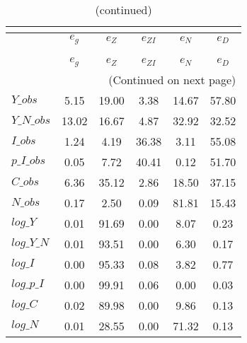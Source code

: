  
\begin{center}
\begin{longtable}{lccccc} 
\caption{VARIANCE DECOMPOSITION (in percent)}\\
 \label{Table:th_var_decomp_uncond}\\
\toprule 
$           $	 & 	 $       {e_g}$	 & 	 $       {e_Z}$	 & 	 $    {e_{ZI}}$	 & 	 $       {e_N}$	 & 	 $       {e_D}$\\
\midrule \endfirsthead 
\caption{(continued)}\\
 \toprule \\ 
$           $	 & 	 $       {e_g}$	 & 	 $       {e_Z}$	 & 	 $    {e_{ZI}}$	 & 	 $       {e_N}$	 & 	 $       {e_D}$\\
\midrule \endhead 
\midrule \multicolumn{6}{r}{(Continued on next page)} \\ \bottomrule \endfoot 
\bottomrule \endlastfoot 
$Y\_obs     $	 & 	        5.15	 & 	       19.00	 & 	        3.38	 & 	       14.67	 & 	       57.80 \\ 
$Y\_N\_obs  $	 & 	       13.02	 & 	       16.67	 & 	        4.87	 & 	       32.92	 & 	       32.52 \\ 
$I\_obs     $	 & 	        1.24	 & 	        4.19	 & 	       36.38	 & 	        3.11	 & 	       55.08 \\ 
$p\_I\_obs  $	 & 	        0.05	 & 	        7.72	 & 	       40.41	 & 	        0.12	 & 	       51.70 \\ 
$C\_obs     $	 & 	        6.36	 & 	       35.12	 & 	        2.86	 & 	       18.50	 & 	       37.15 \\ 
$N\_obs     $	 & 	        0.17	 & 	        2.50	 & 	        0.09	 & 	       81.81	 & 	       15.43 \\ 
$log\_Y     $	 & 	        0.01	 & 	       91.69	 & 	        0.00	 & 	        8.07	 & 	        0.23 \\ 
$log\_Y\_N  $	 & 	        0.01	 & 	       93.51	 & 	        0.00	 & 	        6.30	 & 	        0.17 \\ 
$log\_I     $	 & 	        0.00	 & 	       95.33	 & 	        0.08	 & 	        3.82	 & 	        0.77 \\ 
$log\_p\_I  $	 & 	        0.00	 & 	       99.91	 & 	        0.06	 & 	        0.00	 & 	        0.03 \\ 
$log\_C     $	 & 	        0.02	 & 	       89.98	 & 	        0.00	 & 	        9.86	 & 	        0.13 \\ 
$log\_N     $	 & 	        0.01	 & 	       28.55	 & 	        0.00	 & 	       71.32	 & 	        0.13 \\ 
\end{longtable}
 \end{center}
